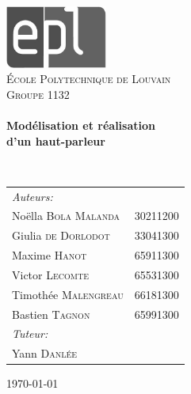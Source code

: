 \begin{titlepage}
\begin{center}

\includegraphics[width=0.25\textwidth]{img/epl-logo-bw}~\\[1cm]

\textsc{\LARGE École Polytechnique de Louvain}\\[1cm]

\textsc{\Large Groupe 1132}\\[0.5cm]

\HRule \\[0.3cm]
{ \huge \bfseries Modélisation et réalisation \\ d’un haut-parleur \\[0.3cm] }

\HRule \\[0.8cm]

{\large
\begin{tabu} to 0.67\linewidth {Xl}
    \emph{Auteurs:}\\
    \quad Noëlla \textsc{Bola Malanda} & 30211200\\
    \quad Giulia \textsc{de Dorlodot} & 33041300\\
    \quad Maxime \textsc{Hanot} & 65911300\\
    \quad Victor \textsc{Lecomte} & 65531300\\
    \quad Timothée \textsc{Malengreau} & 66181300\\
    \quad Bastien \textsc{Tagnon} & 65991300\\[.5ex]
    
    \emph{Tuteur:}\\
    \quad Yann \textsc{Danlée}\\
\end{tabu}
}

\vfill

{\large \today}

\end{center}
\end{titlepage}
